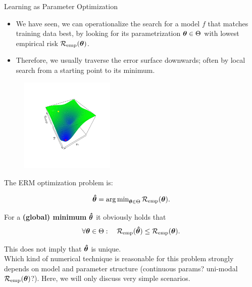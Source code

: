 \documentclass[11pt,compress,t,notes=noshow, xcolor=table]{beamer}
\begin{document}
\begin{vbframe}{Learning as Parameter Optimization}
\begin{itemize}
\item We have seen, we can operationalize the search for a model $f$ that matches
    training data best, by looking for its parametrization $\bm{\theta} \in \Theta$
    with lowest empirical risk $\mathcal{R}_{\text{emp}}(\bm{\theta})$.
\item Therefore, we usually traverse the error surface downwards; often by local search from a starting point to its minimum.
\end{itemize}
\begin{center}
\begin{figure}[!b]
\includegraphics[trim=2.4cm 2.4cm 2.4cm 2.4cm, width=0.4\textwidth]{figure/err_surf}
\end{figure}
\end{center}

\framebreak

The ERM optimization problem is:

\[
\bm{\hat\theta}  = \operatorname{arg\,min}_{\bm{\theta} \in \Theta} \mathcal{R}_{\text{emp}}(\bm{\theta}) .
\]

For a \textbf{(global) minimum} $\bm{\hat\theta}$ it obviously holds that
\[
\forall \bm{\theta} \in \Theta :\quad \mathcal{R}_{\text{emp}}(\bm{\hat\theta}) \leq \mathcal{R}_{\text{emp}}(\bm{\theta}) .
\]

This does not imply that $\bm{\hat\theta}$ is unique. \\
\lz
Which kind of numerical technique is reasonable for this problem strongly depends
on model and parameter structure (continuous params? uni-modal $\mathcal{R}_{\text{emp}}(\bm{\theta})$?).
Here, we will only discuss very simple scenarios.

\end{vbframe}
\end{document}
